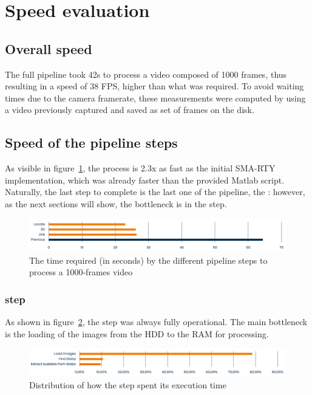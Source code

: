 \section{Speed evaluation}
\label{sec:results:speed}

\subsection{Overall speed}

The full pipeline took 42s to process a video composed of 1000 frames, thus resulting in a speed of 38 FPS, higher than what was required.
To avoid waiting times due to the camera framerate, these measurements were computed by using a video previously captured and saved as set of frames on the disk.

\subsection{Speed of the pipeline steps}

As visible in figure~\ref{fig:speed:all-pipeline}, the process is 2.3x as fast as the initial SMA-RTY implementation, which was already faster than the provided Matlab script.
Naturally, the last step to complete is the last one of the pipeline, the \link*: however, as the next sections will show, the bottleneck is in the \locate* step.

\begin{figure}
	\centerline{\includegraphics[width=\textwidth]{images/speed/overall-speed.png}}
	\caption{\centering The time required (in seconds) by the different pipeline steps to process a 1000-frames video}
	\label{fig:speed:all-pipeline}
\end{figure}

\subsubsection{\locate* step}

As shown in figure~\ref{fig:speed:locate}, the \locate* step was always fully operational.
The main bottleneck is the loading of the images from the HDD to the RAM for processing.

\begin{figure}
	\centerline{\includegraphics[width=\textwidth]{images/speed/locate.png}}
	\caption{\centering Distribution of how the \locate* step spent its execution time}
	\label{fig:speed:locate}
\end{figure}

